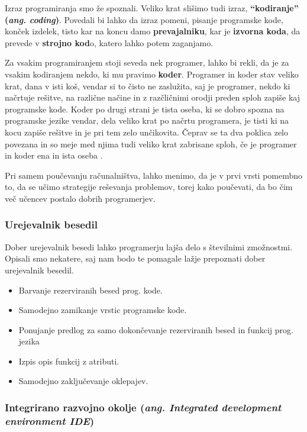 Izraz programiranja smo že spoznali. Veliko krat slišimo tudi izraz,
\textbf{``kodiranje'' (\emph{ang. coding})}. Povedali bi lahko da
izraz pomeni, pisanje programske kode, konček izdelek, tisto kar na
koncu damo \textbf{prevajalniku}, kar je \textbf{izvorna koda}, da
prevede v \textbf{strojno kod}o, katero lahko potem zaganjamo.

Za vsakim programiranjem stoji seveda nek programer, lahko bi rekli,
da je za vsakim kodiranjem nekdo, ki mu pravimo
\textbf{koder}. Programer in koder stav veliko krat, dana v isti koš,
vendar si to čisto ne zaslužita, saj je programer, nekdo ki načrtuje
rešitve, na različne načine in z razčličnimi orodji preden sploh
zapiše kaj programske kode. Koder po drugi strani je tista oseba, ki
se dobro spozna na programske jezike vendar, dela veliko krat po
načrtu programera, je tisti ki na kocu zapiše rešitve in je pri tem
zelo unčikovita. Čeprav se ta dva poklica zelo povezana in so meje med
njima tudi veliko krat zabrisane sploh, če je programer in koder ena
in ista oseba \cite{web:coder}.

Pri samem poučevanju računalništva, lahko menimo, da je v prvi vrsti
pomembno to, da se učimo strategije reševanja problemov, torej kako
poučevati, da bo čim več učencev postalo dobrih programerjev.

\subsubsection{Urejevalnik besedil}
\label{sec:urejevalnik_besedil}

Dober urejevalnik besedi lahko programerju lajša delo s številnimi
zmožnostmi. Opisali smo nekatere, saj nam bodo te pomagale lažje
prepoznati dober urejevalnik besedil.


\begin{itemize}
\item Barvanje rezerviranih besed prog. kode.
\item Samodejno zamikanje vrstic programske kode.
\item Ponujanje predlog za samo dokončevanje rezerviranih
    besed in funkcij prog. jezika
\item Izpis opis funkcij z atributi.
\item Samodejno zaključevanje oklepajev.
\end{itemize}

\subsubsection{Integrirano razvojno okolje (\emph{ang. Integrated
    development environment \textbf{IDE}})}

